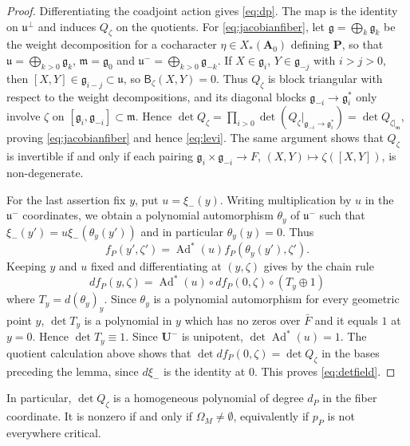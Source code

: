 \documentclass[11pt,reqno]{amsart}
\numberwithin{equation}{section}
\theoremstyle{plain}
\theoremstyle{definition}
\theoremstyle{remark}
\theoremstyle{plain}
\newcommand{\bG}{\mathbf{G}}     %
\newcommand{\bA}{\mathbf{A}}     %
\newcommand{\bP}{\mathbf{P}}     %
\newcommand{\bU}{\mathbf{U}}     %
\newcommand{\g}{\mathfrak{g}}    %
\newcommand{\uu}{\mathfrak{u}}   %
\newcommand{\m}{\mathfrak{m}}    %
\DeclareMathOperator{\Ad}{Ad}
\newcommand{\Bf}{\mathsf{B}}
\newcommand{\nf}{\zeta}
\begin{document}
\begin{proof}
Differentiating the coadjoint action gives \eqref{eq:dp}. The map is
the identity on $\uu^\perp$ and induces $Q_\nf$ on the quotients.
For \eqref{eq:jacobianfiber}, let $\g=\bigoplus_k\g_k$ be the weight
decomposition for a cocharacter $\eta\in X_*(\bA_0)$ defining $\bP$, so that
$\uu=\bigoplus_{k>0}\g_k$, $\m=\g_0$ and $\uu^-=\bigoplus_{k>0}\g_{-k}$.
If $X\in\g_i$, $Y\in\g_{-j}$ with $i>j>0$, then $[X,Y]\in\g_{i-j}\subset\uu$,
so $\Bf_\nf(X,Y)=0$. Thus $Q_\nf$ is block triangular with respect to the
weight decompositions, and its diagonal blocks $\g_{-i}\to\g_i^*$ only
involve $\nf$ on $[\g_i,\g_{-i}]\subset\m$. Hence
$\det Q_\nf=\prod_{i>0}\det(Q_\nf|_{\g_{-i}\to\g_i^*})=\det Q_{\nf|_\m}$,
proving \eqref{eq:jacobianfiber} and hence \eqref{eq:levi}. The same
argument shows that $Q_\nf$ is invertible if and only if each pairing
$\g_i\times\g_{-i}\to F$, $(X,Y)\mapsto\nf([X,Y])$, is non-degenerate.

For the last assertion fix $y$, put $u=\xi_-(y)$. Writing multiplication by $u$ in the $\uu^-$ coordinates, we obtain a polynomial automorphism
$\theta_y$ of $\uu^-$ such that $\xi_-(y')=u\xi_-(\theta_y(y'))$ and in particular $\theta_y(y)=0$. Thus
\[
f_P(y',\nf')=\Ad^*(u)f_P(\theta_y(y'),\nf').
\]
Keeping $y$ and $u$ fixed and differentiating at $(y,\nf)$ gives by the chain rule
\[
df_P(y,\nf)=\Ad^*(u)\circ df_P(0,\nf)\circ(T_y\oplus1)
\]
where $T_y=d(\theta_y)_y$.
Since $\theta_y$ is a polynomial automorphism for every geometric point $y$, $\det T_y$ is a polynomial in $y$ which has no zeros over $\bar F$
and it equals $1$ at $y=0$. Hence $\det T_y\equiv1$.
Since $\bU^-$ is unipotent, $\det\Ad^*(u)=1$. The quotient calculation
above shows that $\det df_P(0,\nf)=\det Q_\nf$ in the bases
preceding the lemma, since $d\xi_-$ is the identity at $0$. This proves \eqref{eq:detfield}.
\end{proof}

In particular, $\det Q_\nf$ is a homogeneous polynomial of degree
$d_P$ in the fiber coordinate. It is nonzero if and only if
$\Omega_M\ne\emptyset$, equivalently if $p_P$ is not everywhere critical.
\end{document}
